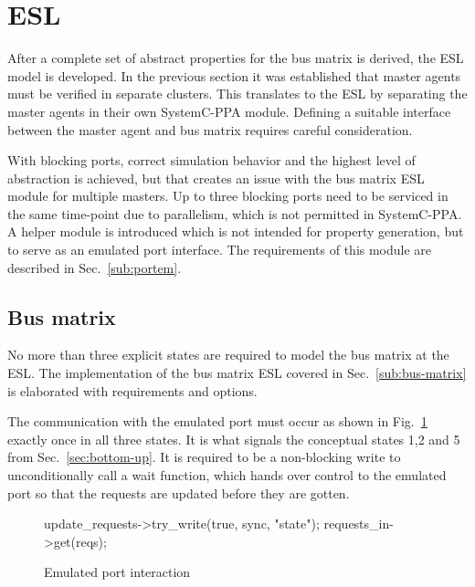 \section{ESL}
After a complete set of abstract properties for the bus matrix is derived, the ESL model is developed. In the previous section it was established that master agents must be verified in separate clusters. This translates to the ESL by separating the master agents in their own SystemC-PPA module. Defining a suitable interface between the master agent and bus matrix requires careful consideration. \par
With blocking ports, correct simulation behavior and the highest level of abstraction is achieved, but that creates an issue with the bus matrix ESL module for multiple masters. Up to three blocking ports need to be serviced in the same time-point due to parallelism, which is not permitted in SystemC-PPA. A helper module is introduced which is not intended for property generation, but to serve as an emulated port interface. The requirements of this module are described in Sec.~\ref{sub:portem}.

\subsection{Bus matrix}
\label{sub:bus-matrix-design}
No more than three explicit states are required to model the bus matrix at the ESL. The implementation of the bus matrix ESL covered in Sec.~\ref{sub:bus-matrix} is elaborated with requirements and options. \par
The communication with the emulated port must occur as shown in Fig.~\ref{fig:em-port-code} exactly once in all three states. It is what signals the conceptual states 1,2 and 5 from Sec.~\ref{sec:bottom-up}. It is required to be a non-blocking write to unconditionally call a wait function, which hands over control to the emulated port so that the requests are updated before they are gotten. 
\begin{figure}[h!]
\begin{C++}
update_requests->try_write(true, sync, "state");  
requests_in->get(reqs); 
\end{C++}
\caption{Emulated port interaction}
\label{fig:em-port-code}
\end{figure}

